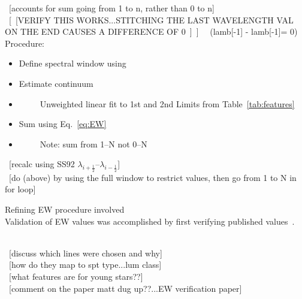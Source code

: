 ~[accounts for sum going from 1 to n, rather than 0 to n]\\
~[~[VERIFY THIS WORKS...STITCHING THE LAST WAVELENGTH VAL ON THE END CAUSES A DIFFERENCE OF 0~]~] ~~(lamb[-1] - lamb[-1]= 0)\\






Procedure:\\
\begin{itemize}
	\item{} Define spectral window using
	\item{} Estimate continuum
	\item{}~~~~~Unweighted linear fit to 1st and 2nd Limits from Table~\ref{tab:features}
	\item{} Sum using Eq.~\ref{eq:EW}
	\item{}~~~~~Note: sum from 1--N not 0--N
\end{itemize}





~[recalc using SS92 $\lambda_{i+\frac{1}{2}}$--$\lambda_{i-\frac{1}{2}}$]\\
~[do (above) by using the full window to restrict values, then go from 1 to N in for loop]


Refining EW procedure involved \\
Validation of EW values was accomplished by first verifying published values~\cite{Rayner_2009}.  

~\\~[discuss which lines were chosen and why]\\
~[how do they map to spt type...lum class]\\
~[what features are for young stars??]\\
~[comment on the paper matt dug up??...EW verification paper]



